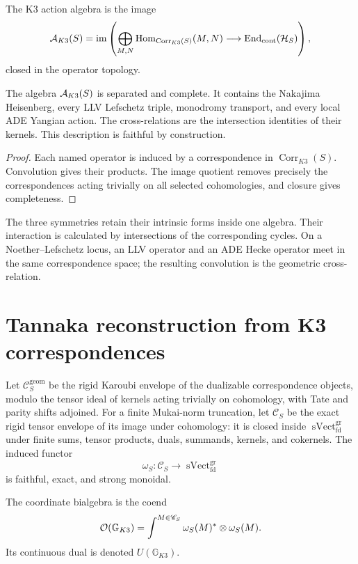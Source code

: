 \begin{definition}
The K3 action algebra is the image
\[
 \mathcal A_{K3}(S)=
 \operatorname{im}\left(
 \bigoplus_{M,N}\operatorname{Hom}_{\operatorname{Corr}_{K3}(S)}(M,N)
 \longrightarrow\operatorname{End}_{\mathrm{cont}}(\mathcal H_S)
 \right),
\]
closed in the operator topology.
\end{definition}

\begin{theorem}
The algebra $\mathcal A_{K3}(S)$ is separated and complete.  It contains the Nakajima Heisenberg, every LLV Lefschetz triple, monodromy transport, and every local ADE Yangian action.  The cross-relations are the intersection identities of their kernels.  This description is faithful by construction.
\end{theorem}
\begin{proof}
Each named operator is induced by a correspondence in $\operatorname{Corr}_{K3}(S)$.  Convolution gives their products.  The image quotient removes precisely the correspondences acting trivially on all selected cohomologies, and closure gives completeness.
\end{proof}

The three symmetries retain their intrinsic forms inside one algebra.  Their interaction is calculated by intersections of the corresponding cycles.  On a Noether--Lefschetz locus, an LLV operator and an ADE Hecke operator meet in the same correspondence space; the resulting convolution is the geometric cross-relation.

\chapter{Tannaka reconstruction from K3 correspondences}
Let $\mathscr C_S^{\mathrm{geom}}$ be the rigid Karoubi envelope of the dualizable correspondence objects, modulo the tensor ideal of kernels acting trivially on cohomology, with Tate and parity shifts adjoined.  For a finite Mukai-norm truncation, let $\mathscr C_S$ be the exact rigid tensor envelope of its image under cohomology: it is closed inside $\operatorname{sVect}^{\mathrm{gr}}_{\mathrm{fd}}$ under finite sums, tensor products, duals, summands, kernels, and cokernels.  The induced functor
\[
 \omega_S:\mathscr C_S\longrightarrow\operatorname{sVect}^{\mathrm{gr}}_{\mathrm{fd}}
\]
is faithful, exact, and strong monoidal.

\begin{definition}
The coordinate bialgebra is the coend
\[
 \mathcal O(\mathbb G_{K3})
 =\int^{M\in\mathscr C_S}\omega_S(M)^*\otimes\omega_S(M).
\]
Its continuous dual is denoted $U(\mathbb G_{K3})$.
\end{definition}

